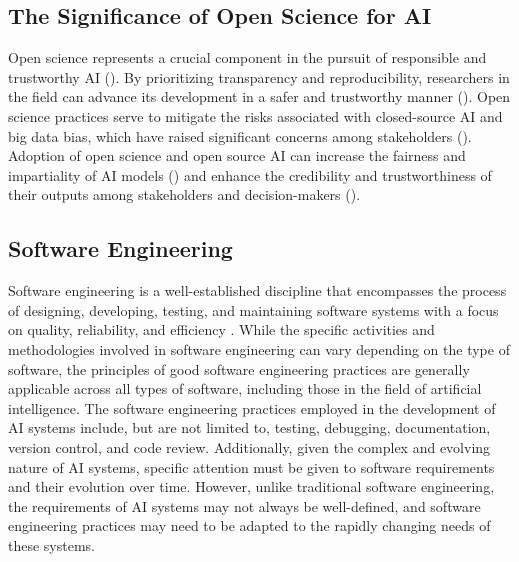 \documentclass{IEEEtran}
\begin{document}





\subsection{The Significance of Open Science for AI}

 
Open science represents a crucial component in the pursuit of responsible and trustworthy AI (\cite{floridi2019establishing,coro2020open,braun2018open,hicks2021open}). By prioritizing transparency and reproducibility, researchers in the field can advance its development in a safer and trustworthy manner (\cite{coro2020open,floridi2018ai4people,kocak2022transparency,stodden-towardreprodicibleresearch}).
Open science practices serve to mitigate the risks associated with closed-source AI and big data bias, which have raised significant concerns among stakeholders (\cite{batarseh2020data, o2017weapons}). Adoption of open science and open source AI can increase the fairness and impartiality of AI models (\cite{stodden-towardreprodicibleresearch,accountabilityInAi,gundersen2018reproducible}) and enhance the credibility and trustworthiness of their outputs among stakeholders and decision-makers (\cite{goodman2017european,hsiao2018vtaiwan,praprotnikevaluation}). %
\subsection{Software Engineering}
Software engineering is a well-established discipline that encompasses the process of designing, developing, testing, and maintaining software systems with a focus on quality, reliability, and efficiency \cite{pressman2010software}. While the specific activities and methodologies involved in software engineering can vary depending on the type of software, the principles of good software engineering practices are generally applicable across all types of software, including those in the field of artificial intelligence. The software engineering practices employed in the development of AI systems include, but are not limited to, testing, debugging, documentation, version control, and code review. Additionally, given the complex and evolving nature of AI systems, specific attention must be given to software requirements and their evolution over time. However, unlike traditional software engineering, the requirements of AI systems may not always be well-defined, and software engineering practices may need to be adapted to the rapidly changing needs of these systems.
\end{document}
